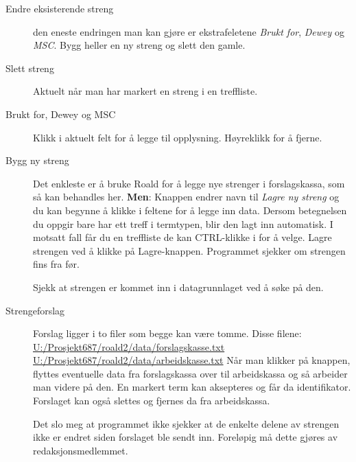 \documentclass[a4paper,norsk,11pt]{article}
\begin{document}
\begin{description}
\item[Endre eksisterende streng] den eneste endringen man kan gjøre er ekstrafeletene \textit{Brukt for}, \textit{Dewey} og \textit{MSC}. Bygg heller en ny streng og slett den gamle.
\item[Slett streng] Aktuelt når man har markert en streng i en treffliste.
\item[Brukt for, Dewey og MSC] Klikk i aktuelt felt for å legge til opplysning. Høyreklikk for å fjerne.
\item[Bygg ny streng] Det enkleste er å bruke Roald for å legge nye strenger i forslagskassa, som så kan behandles her. \textbf{Men}: Knappen endrer navn til \textit{Lagre ny streng} og du kan begynne å klikke i feltene for å legge inn data. Dersom betegnelsen du oppgir bare har ett treff i termtypen, blir den lagt inn automatisk. I motsatt fall får du en treffliste de kan CTRL-klikke i for å velge. Lagre strengen ved å klikke på Lagre-knappen. Programmet sjekker om strengen fins fra før. 

Sjekk at strengen er kommet inn i datagrunnlaget ved å søke på den.
\item[Strengeforslag] Forslag ligger i to filer som begge kan være tomme. Disse filene:\newline
{\footnotesize
\url{U:/Prosjekt687/roald2/data/forslagskasse.txt}\newline
\url{U:/Prosjekt687/roald2/data/arbeidskasse.txt}\newline}
Når man klikker på knappen, flyttes eventuelle data fra forslagskassa over til arbeidskassa og så arbeider man videre på den. En markert term kan aksepteres og får da identifikator. Forslaget kan også slettes og fjernes da fra arbeidskassa.

Det slo meg at programmet ikke sjekker at de enkelte delene av strengen ikke er endret siden forslaget ble sendt inn. Foreløpig må dette gjøres av redaksjonsmedlemmet.

\end{description}
\end{document}
